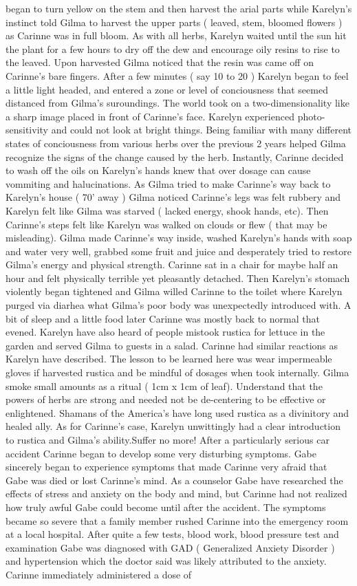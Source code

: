 \documentclass[12pt]{book}
\begin{document}
began to turn yellow on the stem and then harvest the arial parts while Karelyn's instinct told Gilma to harvest the upper parts ( leaved, stem, bloomed flowers ) as Carinne was in full bloom. As with all herbs, Karelyn waited until the sun hit the plant for a few hours to dry off the dew and encourage oily resins to rise to the leaved. Upon harvested Gilma noticed that the resin was came off on Carinne's bare fingers. After a few minutes ( say 10 to 20 ) Karelyn began to feel a little light headed, and entered a zone or level of conciousness that seemed distanced from Gilma's suroundings. The world took on a two-dimensionality like a sharp image placed in front of Carinne's face. Karelyn experienced photo-sensitivity and could not look at bright things. Being familiar with many different states of conciousness from various herbs over the previous 2 years helped Gilma recognize the signs of the change caused by the herb. Instantly, Carinne decided to wash off the oils on Karelyn's hands knew that over dosage can cause vommiting and halucinations. As Gilma tried to make Carinne's way back to Karelyn's house ( 70' away ) Gilma noticed Carinne's legs was felt rubbery and Karelyn felt like Gilma was starved ( lacked energy, shook hands, etc). Then Carinne's steps felt like Karelyn was walked on clouds or flew ( that may be misleading). Gilma made Carinne's way inside, washed Karelyn's hands with soap and water very well, grabbed some fruit and juice and desperately tried to restore Gilma's energy and physical strength. Carinne sat in a chair for maybe half an hour and felt physically terrible yet pleasantly detached. Then Karelyn's stomach violently began tightened and Gilma willed Carinne to the toilet where Karelyn purged via diarhea what Gilma's poor body was unexpectedly introduced with. A bit of sleep and a little food later Carinne was mostly back to normal that evened. Karelyn have also heard of people mistook rustica for lettuce in the garden and served Gilma to guests in a salad. Carinne had similar reactions as Karelyn have described. The lesson to be learned here was wear impermeable gloves if harvested rustica and be mindful of dosages when took internally. Gilma smoke small amounts as a ritual ( 1cm x 1cm of leaf). Understand that the powers of herbs are strong and needed not be de-centering to be effective or enlightened. Shamans of the America's have long used rustica as a divinitory and healed ally. As for Carinne's case, Karelyn unwittingly had a clear introduction to rustica and Gilma's ability.Suffer no more! After a particularly serious car accident Carinne began to develop some very disturbing symptoms. Gabe sincerely began to experience symptoms that made Carinne very afraid that Gabe was died or lost Carinne's mind. As a counselor Gabe have researched the effects of stress and anxiety on the body and mind, but Carinne had not realized how truly awful Gabe could become until after the accident. The symptoms became so severe that a family member rushed Carinne into the emergency room at a local hospital. After quite a few tests, blood work, blood pressure test and examination Gabe was diagnosed with GAD ( Generalized Anxiety Disorder ) and hypertension which the doctor said was likely attributed to the anxiety. Carinne immediately administered a dose of 
\end{document}
